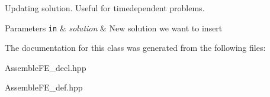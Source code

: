 Updating solution. Useful for timedependent problems. 


\begin{DoxyParams}[1]{Parameters}
\mbox{\tt in}  & {\em solution} & New solution we want to insert \\
\hline
\end{DoxyParams}


The documentation for this class was generated from the following files\+:\begin{DoxyCompactItemize}
\item 
Assemble\+F\+E\+\_\+decl.\+hpp\item 
Assemble\+F\+E\+\_\+def.\+hpp\end{DoxyCompactItemize}
